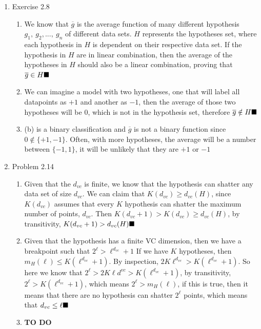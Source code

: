 \documentclass{article}
\begin{document}
    \begin{enumerate}
        \item Exercise 2.8
        \begin{enumerate}[label=(\alph*)]
            \item We know that $\overline{g}$ is the average function of many different hypothesis $g_1,\ g_2,...,\ g_n$ of different data sets. $H$ represents the hypotheses set, where each hypothesis in $H$ is dependent on their respective data set. If the hypothesis in $H$ are in linear combination, then the average of the hypotheses in $H$ should also be a linear combination, proving that $\overline{g} \in H \hfill \blacksquare$
            \item We can imagine a model with two hypotheses, one that will label all datapoints as $+1$ and another as $-1$, then the average of those two hypotheses will be $0$, which is not in the hypothesis set, therefore $\overline{g} \notin H \hfill \blacksquare$
            \item (b) is a binary classification and $\overline{g}$ is not a binary function since $0 \notin \{+1, -1\}$. Often, with more hypotheses, the average will be a number between $\{-1, 1\}$, it will be unlikely that they are $+1$ or $-1$
        \end{enumerate}

        \item Problem 2.14
        \begin{enumerate}
            \item Given that the $d_{vc}$ is finite, we know that the hypothesis can shatter any data set of size $d_{vc}$. We can claim that $K(d_{vc}) \geq d_{vc}(H)$, since $K(d_{vc})$ assumes that every $K$ hypothesis can shatter the maximum number of points, $d_{vc}$. Then $K(d_{vc} + 1) > K(d_{vc}) \geq d_{vc}(H)$, by transitivity, $K(d_{vc} + 1) > d_{vc}(H) \hfill \blacksquare$
            \item Given that the hypothesis has a finite VC dimension, then we have a breakpoint such that $2^\ell > \ell^{d_{vc}} + 1$ If we have $K$ hypotheses, then $m_H(\ell) \leq K(\ell^{d_{vc}}+1)$. By inspection, $2K\ell^{d_{vc}} > K(\ell^{d_{vc}} + 1)$. So here we know that $2^\ell > 2K\ell d^{vc} > K(\ell ^{d_{vc}} + 1)$, by transitivity, $2^\ell > K(\ell ^{d_{vc}} + 1)$, which means $2^\ell > m_H(\ell)$, if this is true, then it means that there are no hypothesis can shatter $2^\ell$ points, which means that $d_{vc} \leq \ell \hfill \blacksquare$
            \item \textbf{TO DO}
        \end{enumerate}


\end{enumerate}
\end{document}
